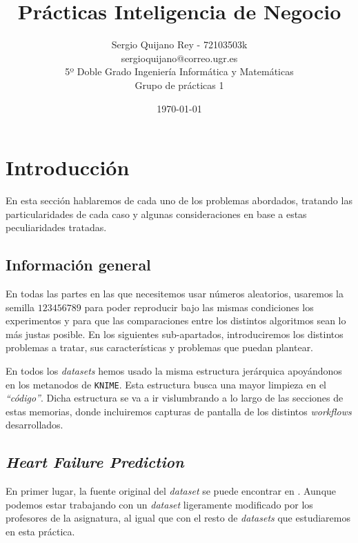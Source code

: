 \documentclass[11pt]{article}
\title{
    {Prácticas Inteligencia de Negocio}
}
\author{
    {Sergio Quijano Rey - 72103503k}\\
    {sergioquijano@correo.ugr.es} \\
    {5º Doble Grado Ingeniería Informática y Matemáticas} \\
    {Grupo de prácticas 1}
}
\date{\today}
\begin{document}
\maketitle
\pagebreak

\tableofcontents


\listoffigures
{}

\pagebreak

\section{Introducción}

En esta sección hablaremos de cada uno de los problemas abordados, tratando las particularidades de cada caso y algunas consideraciones en base a estas peculiaridades tratadas.

\subsection{Información general}

En todas las partes en las que necesitemos usar números aleatorios, usaremos la semilla $123456789$ para poder reproducir bajo las mismas condiciones los experimentos y para que las comparaciones entre los distintos algoritmos sean lo más justas posible. En los siguientes sub-apartados, introduciremos los distintos problemas a tratar, sus características y problemas que puedan plantear.

En todos los \emph{datasets} hemos usado la misma estructura jerárquica apoyándonos en los metanodos de \lstinline{KNIME}. Esta estructura busca una mayor limpieza en el \emph{``código''}. Dicha estructura se va a ir vislumbrando a lo largo de las secciones de estas memorias, donde incluiremos capturas de pantalla de los distintos \emph{workflows} desarrollados.

\pagebreak

\subsection{\emph{Heart Failure Prediction}} \label{intro_dataset01:seccion}

En primer lugar, la fuente original del \emph{dataset} se puede encontrar en \cite{heart_disease_dataset:online}. Aunque podemos estar trabajando con un \emph{dataset} ligeramente modificado por los profesores de la asignatura, al igual que con el resto de \emph{datasets} que estudiaremos en esta práctica.
\end{document}

